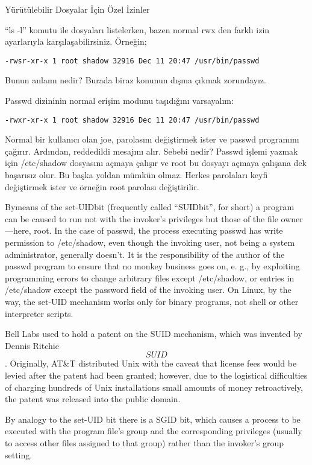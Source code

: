 \begin{section}{Yürütülebilir Dosyalar İçin Özel İzinler}

“ls -l” komutu ile dosyaları listelerken, bazen normal rwx den farklı izin ayarlarıyla karşılaşabilirsiniz. Örneğin;
\begin{verbatim}
-rwsr-xr-x 1 root shadow 32916 Dec 11 20:47 /usr/bin/passwd
\end{verbatim}

Bunun anlamı nedir? Burada biraz konunun dışına çıkmak zorundayız.

Passwd dizininin normal erişim modunu taşıdığını varsayalım:
\begin{verbatim}
-rwxr-xr-x 1 root shadow 32916 Dec 11 20:47 /usr/bin/passwd
\end{verbatim}

Normal bir kullanıcı olan joe, parolasını değiştirmek ister ve passwd programını çağırır. Ardından, reddedildi mesajını alır. Sebebi nedir? Passwd işlemi yazmak için /etc/shadow dosyasını açmaya çalışır ve root bu dosyayı açmaya çalışana dek başarısız olur. Bu başka yoldan mümkün olmaz. Herkes parolaları keyfi değiştirmek ister ve örneğin root parolası değiştirilir.

Bymeans of the set-UIDbit (frequently called “SUIDbit”, for short) a program can be caused to run not with the invoker’s privileges but those of the file owner—here, root. In the case of passwd, the process executing passwd has write permission to /etc/shadow, even though the invoking user, not being a system administrator, generally doesn’t. It is the responsibility of the author of the passwd program to ensure that no monkey business goes on, e. g., by exploiting programming errors to change arbitrary files except /etc/shadow, or entries in /etc/shadow except the password field of the invoking user. On Linux, by the way, the set-UID mechanism works only for binary programs, not shell or other interpreter scripts.

Bell Labs used to hold a patent on the SUID mechanism, which was invented by Dennis Ritchie \[SUID\]. Originally, AT\&T distributed Unix with the caveat that license fees would be levied after the patent had been granted; however, due to the logistical difficulties of charging hundreds of Unix installations small amounts of money retroactively, the patent was released into the public domain.

By analogy to the set-UID bit there is a SGID bit, which causes a process to be executed with the program file’s group and the corresponding privileges (usually to access other files assigned to that group) rather than the invoker’s group setting.


\end{section}
